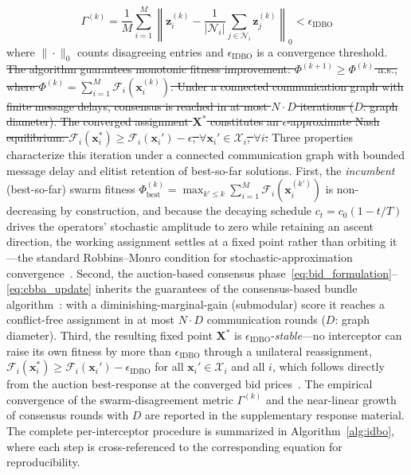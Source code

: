 \documentclass[lettersize,journal]{IEEEtran}
\newcommand{\hladd}[1]{{\color{blue}#1}}
\newcommand{\hldel}[1]{{\color{red}\sout{#1}}}
\begin{document}
\begin{equation}
\label{eq:convergence}
\Gamma^{(k)} = \frac{1}{M} \sum_{i=1}^{M} \left\| \mathbf{z}_i^{(k)} - \frac{1}{|\mathcal{N}_i|} \sum_{j \in \mathcal{N}_i} \mathbf{z}_j^{(k)} \right\|_0 < \epsilon_{\mathrm{IDBO}}
\end{equation}
where $\|\cdot\|_0$ counts disagreeing entries and $\epsilon_{\mathrm{IDBO}}$ is a convergence threshold. \hldel{The algorithm guarantees monotonic fitness improvement: $\Phi^{(k+1)} \geq \Phi^{(k)}$ a.s., where $\Phi^{(k)} = \sum_{i=1}^{M} \mathcal{F}_i(\mathbf{x}_i^{(k)})$. Under a connected communication graph with finite message delays, consensus is reached in at most $N \cdot D$ iterations ($D$: graph diameter). The converged assignment $\mathbf{X}^*$ constitutes an $\epsilon$-approximate Nash equilibrium: $\mathcal{F}_i(\mathbf{x}_i^*) \geq \mathcal{F}_i(\mathbf{x}_i') - \epsilon$, $\forall \mathbf{x}_i' \in \mathcal{X}_i$, $\forall i$.} \hladd{Three properties characterize this iteration under a connected communication graph with bounded message delay and elitist retention of best-so-far solutions. First, the \emph{incumbent} (best-so-far) swarm fitness $\Phi_{\mathrm{best}}^{(k)}=\max_{k'\le k}\sum_{i=1}^{M}\mathcal{F}_i(\mathbf{x}_i^{(k')})$ is non-decreasing by construction, and because the decaying schedule $c_t=c_0(1-t/T)$ drives the operators' stochastic amplitude to zero while retaining an ascent direction, the working assignment settles at a fixed point rather than orbiting it---the standard Robbins--Monro condition for stochastic-approximation convergence~\cite{robbins1951stochastic}. Second, the auction-based consensus phase~\eqref{eq:bid_formulation}--\eqref{eq:cbba_update} inherits the guarantees of the consensus-based bundle algorithm~\cite{choi2009consensus}: with a diminishing-marginal-gain (submodular) score it reaches a conflict-free assignment in at most $N\!\cdot\!D$ communication rounds ($D$: graph diameter). Third, the resulting fixed point $\mathbf{X}^\ast$ is $\epsilon_{\mathrm{IDBO}}$-\emph{stable}---no interceptor can raise its own fitness by more than $\epsilon_{\mathrm{IDBO}}$ through a unilateral reassignment, $\mathcal{F}_i(\mathbf{x}_i^\ast)\ge\mathcal{F}_i(\mathbf{x}_i')-\epsilon_{\mathrm{IDBO}}$ for all $\mathbf{x}_i'\in\mathcal{X}_i$ and all $i$, which follows directly from the auction best-response at the converged bid prices~\cite{choi2009consensus}. The empirical convergence of the swarm-disagreement metric $\Gamma^{(k)}$ and the near-linear growth of consensus rounds with $D$ are reported in the supplementary response material. The complete per-interceptor procedure is summarized in Algorithm~\ref{alg:idbo}, where each step is cross-referenced to the corresponding equation for reproducibility.}
\end{document}
